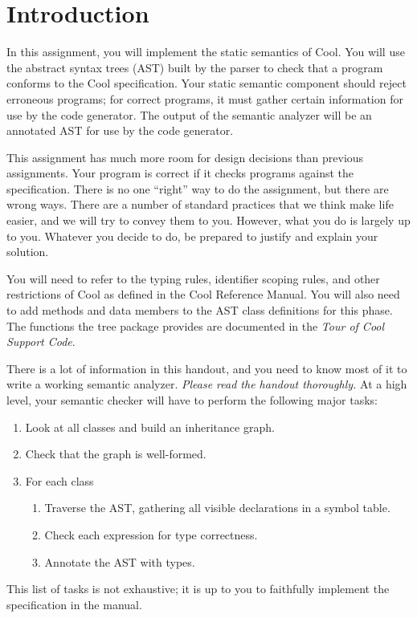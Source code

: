 \documentclass[11pt]{article}
\begin{document}

%
\def\U#1{{\sf{}#1}}
\def\S#1{{\tt{}#1}} %
\def\C#1{{\bf{}#1}}

\bigskip
\section{Introduction} 

In this assignment, you will implement the static semantics of Cool.  You
will use the abstract syntax trees (AST) built by the parser to check
that a program conforms to the Cool specification. Your
static semantic component should reject erroneous programs; for correct
programs, it must gather certain information for use by the code
generator.  The output of the semantic analyzer will be an annotated
AST for use by the code generator.

This assignment has much more room for design decisions than previous
assignments. Your program is correct if it checks programs against the
specification. There is no one ``right'' way to do the assignment, but there
are wrong ways. There are a number of standard practices that we think
make life easier, and we will try to convey them to you. However, what
you do is largely up to you.  Whatever you decide to do, be prepared to
justify and explain your solution.

You will need to refer to the typing rules, identifier scoping rules,
and other restrictions of Cool as defined in the Cool Reference
Manual.  You will also need to add methods and data members to the AST
class definitions for this phase.  The functions the tree package
provides are documented in the {\em Tour of Cool Support Code}.

There is a lot of information in this handout, and you need to know most
of it to write a working semantic analyzer.  {\em Please read the
handout thoroughly.}
At a high level, your semantic
checker will have to perform the following major tasks:
\begin{enumerate}
\item Look at all classes and build an inheritance graph.
\item Check that the graph is well-formed.
\item For each class
\begin{enumerate}
\item Traverse the AST, gathering all visible declarations in a symbol table.
\item Check each expression for type correctness.
\item Annotate the AST with types.
\end{enumerate}
\end{enumerate}
This list of tasks is not exhaustive; it is up to you to faithfully
implement the specification in the manual.
\end{document}
